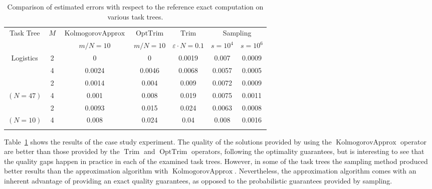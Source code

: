 \documentclass{article}
\DeclareMathOperator{\Trim}{Trim}
\DeclareMathOperator{\KlmApprox}{KolmogorovApprox}
\DeclareMathOperator{\OptTrim}{OptTrim}
\begin{document}
	\begin{table}[th]
		\scriptsize
		\centering
		\renewcommand{\arraystretch}{1.3}
		\begin{tabular}{|c|c|c|c|c|c|c|}
			\hline
			\multirow{2}{*}{Task Tree} & \multirow{2}{*}{$M$} & {$\KlmApprox$} & {$\OptTrim$} & {$\Trim$} & \multicolumn{2}{c|}{Sampling} \\ \cline{3-7} 
			&	& $m/N{=}10$ & $m/N{=}10$ & $\varepsilon\cdot N{=}0.1$ & $s{=}10^{4}$& $s{=}10^{6}$ \\ \hline
			\hline
			
			
			\multirow{2}{*}{Logistics} & 2& 0 & 0 &  0.0019 &  0.007 & 0.0009  \\ \Xcline{2-7}{1pt}
			{\tiny $(N=34)$}& 4& 0.0024 & 0.0046&  0.0068  &   0.0057 & 0.0005 \\\Xhline{1pt}
			
			\multirow{2}{*}{DRC-Drive}  
			&2	& 0.0014 & 0.004&  0.009  & 0.0072 & 0.0009  
			\\ \Xcline{2-7}{1pt}
			
			{\tiny $(N{=}47)$}& {4}& 0.001 & 0.008&  0.019   & 0.0075  & 0.0011 
			\\  \Xhline{1pt}
			
			
			\multirow{2}{*}{Sequential}  & {2} & 0.0093 & 0.015 &  0.024 & 0.0063 & 0.0008 \\ \Xcline{2-7}{1pt}  
			{\tiny $(N{=}10)$} & {4} & 0.008 & 0.024 &  0.04 & 0.008 & 0.0016 \\ \Xhline{1pt}
			
			
			
		\end{tabular}
		\caption{Comparison of estimated errors with respect to the reference exact computation on various task trees.}
		\label{tab:errors}
	\end{table} 
	
	
	
	Table~\ref{tab:errors} shows the results of the case study experiment. The quality of the solutions provided by using the $\KlmApprox$ operator are better than those provided by the $\Trim$ and $\OptTrim$ operators, following the optimality guarantees, but is interesting to see that the quality gaps happen in practice in each of the examined task trees. However, in some of the task trees the sampling method produced better results than the approximation algorithm with $\KlmApprox$. Nevertheless, the approximation algorithm comes with an inherent advantage of providing an exact quality guarantees, as opposed to the probabilistic guarantees provided by sampling.
	
\end{document}
